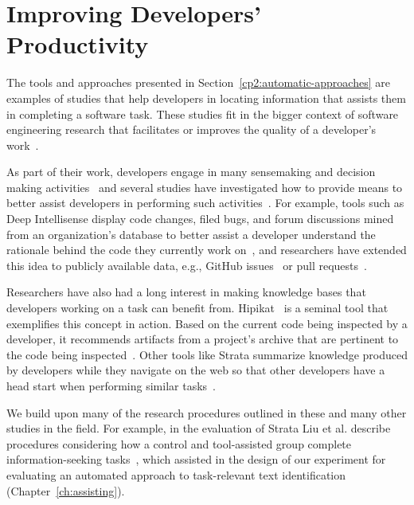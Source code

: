 



\section{Improving Developers' Productivity}
\label{cp2:dev-productivity}



The tools and approaches presented in Section~\ref{cp2:automatic-approaches}
are examples of studies that help developers in locating 
information that assists them in completing a software task.
These studies fit in the bigger context 
of software engineering research 
that facilitates or improves the quality of a developer's work~\cite{Kersten2006, Meyer2017, satterfield2020}. 





As part of their work, developers engage in many sensemaking and decision making activities~\cite{sillito2006} and several studies have investigated how to 
provide means to better  
assist developers in performing such activities~\cite{Liu2018Unakite, liu2021, barnett2015}.
For example, tools such as Deep Intellisense 
display code changes, filed bugs, and forum discussions 
mined from an organization's database to better assist a developer
understand 
the rationale behind the code they currently work on~\cite{Holmes2008},
and researchers have extended this idea to  
publicly available data, e.g., GitHub issues~\cite{Viviani2019}
or pull requests~\cite{freire2021}. 



Researchers have also had a long interest in 
making knowledge bases
that developers working on a task can benefit from. 
Hipikat~\cite{Cubranic2005} is a seminal tool that exemplifies this concept in action.
Based on the current code being inspected by a developer, 
it recommends artifacts from a project's archive 
that are pertinent to the code being inspected~\cite{Cubranic2005}.
Other tools like Strata summarize knowledge produced by developers 
while they navigate on the web so that other developers have a 
 head start when performing similar tasks~\cite{liu2021}.




We build upon many of the research procedures outlined 
in these and many other studies in the field. 
For example, in the evaluation of Strata 
 Liu et al. describe procedures 
considering how a control and tool-assisted group 
complete information-seeking tasks~\cite{liu2021},
which assisted in the design of our experiment for 
evaluating an automated approach to
task-relevant text identification (Chapter~\ref{ch:assisting}).



